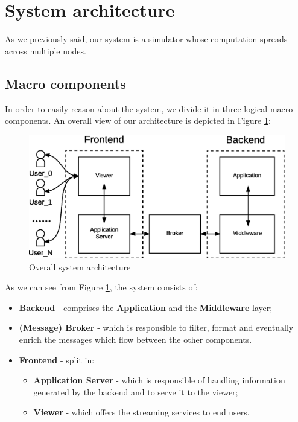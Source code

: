 \section{System architecture}
As we previously said, our system is a simulator whose computation spreads
across multiple nodes.

\subsection{Macro components}

In order to easily reason about the system, we
divide it in three logical macro components.
An overall view of our architecture
is depicted in Figure \ref{fig:sd-sys-arch-overall}:

\begin{figure}[H]
  \centering
  \includegraphics[scale=0.5,keepaspectratio]
    {images/solution/overall-arch.eps}
  \caption{Overall system architecture}
  \label{fig:sd-sys-arch-overall}
\end{figure}

As we can see from Figure \ref{fig:sd-sys-arch-overall}, the system consists of:

\begin{itemize}
  \item \textbf{Backend} - comprises the \textbf{Application} and the
    \textbf{Middleware} layer;
  \item \textbf{(Message) Broker} - which is responsible to filter, format
    and eventually enrich the messages which flow between the other components.
  \item \textbf{Frontend} - split in:
  \begin{itemize}
    \item \textbf{Application Server} - which is responsible of handling
      information generated by the backend and to serve it to the viewer;
    \item \textbf{Viewer} - which offers the streaming services to end users.
  \end{itemize}
\end{itemize}

